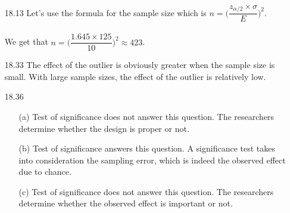 \documentclass[11pt, a4paper]{article}
\begin{document}
\begin{itemize}
\item[]
\item[]

\item[18.13]
Let's use the formula for the sample size which is
$n = \Big(\dfrac{z_{\alpha/2} \times \sigma}{E}\Big)^2$.\\\\
We get that $n = \Big(\dfrac{1.645 \times 125}{10}\Big)^2 \approx 423$.

\item[]
\item[]

\item[18.33]
The effect of the outlier is obviously greater when the sample size
is small. With large sample sizes, the effect of the outlier is relatively low.

\item[]
\item[]

\item[18.36]
\begin{itemize}
\item[(a)]
Test of significance does not answer this question.
The researchers determine whether the design is proper or not.

\item[]

\item[(b)]
Test of significance answers this question.
A significance test takes into consideration the sampling error, which is indeed the observed effect due to chance.

\item[]

\item[(c)]
Test of significance does not answer this question.
The researchers determine whether the observed effect is important or not.
\end{itemize}

\end{itemize}
\end{document}
